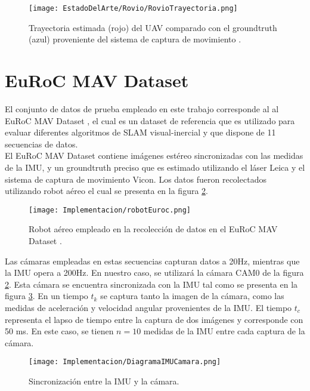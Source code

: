 \begin{figure}[H]
	\centering
	\texttt{[image: EstadoDelArte/Rovio/RovioTrayectoria.png]}
	\caption{Trayectoria estimada (rojo) del UAV comparado con el groundtruth (azul) proveniente del sistema de captura de movimiento .}
	\label{fig:RovioTrayectoria}
\end{figure}



\section{EuRoC MAV Dataset}
El conjunto de datos de prueba empleado en este trabajo corresponde al al EuRoC MAV Dataset \cite{0}, el cual es un dataset de referencia que es utilizado para evaluar diferentes algoritmos de SLAM visual-inercial y que dispone de 11 secuencias de datos. \\


El EuRoC MAV Dataset contiene imágenes estéreo sincronizadas con las medidas de la IMU,  y un groundtruth preciso que es estimado utilizando el láser Leica y el sistema de captura de movimiento Vicon. Los datos fueron recolectados utilizando robot aéreo el cual se presenta en la figura \ref{fig:robotEuroc}. \\

\begin{figure}[H]
	\centering
	\texttt{[image: Implementacion/robotEuroc.png]}
	\caption{Robot aéreo empleado en la recolección de datos en el EuRoC MAV Dataset .}
	\label{fig:robotEuroc}
\end{figure}

Las cámaras empleadas en estas secuencias capturan datos a 20Hz, mientras que la IMU opera a 200Hz. En nuestro caso, se utilizará la cámara CAM0 de la figura \ref{fig:robotEuroc}. Esta cámara se encuentra sincronizada con la IMU tal como se presenta en la figura \ref{fig:sincronizacionEuroc}. En un tiempo $t_k$ se captura tanto la imagen de la cámara, como las medidas de aceleración y velocidad angular provenientes de la IMU. El tiempo $t_c$ representa el lapso de tiempo entre la captura de dos imágenes y corresponde con 50 ms. En este caso, se tienen $n = 10$ medidas de la IMU entre cada captura de la cámara. \\

\begin{figure}[H]
	\centering
	\texttt{[image: Implementacion/DiagramaIMUCamara.png]}
	\caption{Sincronización entre la IMU y la cámara.}
	\label{fig:sincronizacionEuroc}
\end{figure}

